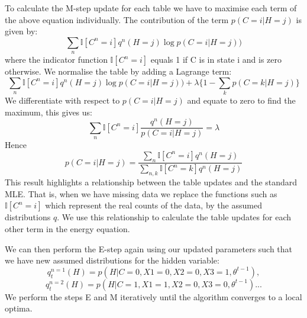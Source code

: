 \documentclass[12pt]{article} %
\begin{document}
To calculate the M-step update for each table we have to maximise each term of the above equation individually. The contribution of the term $p(C=i|H=j)$ is given by:
$$
\displaystyle\sum_{n}\mathbb{I}[C^n=i]q^n(H=j) \log p(C=i|H=j))
$$
where the indicator function $\mathbb{I}[C^n=i]$ equals 1 if C is in state i and is zero otherwise.
We normalise the table by adding a Lagrange term:
$$
\displaystyle\sum_{n}\mathbb{I}[C^n=i]q^n(H=j) \log p(C=i|H=j))
+ \lambda\{1-\sum_{k}p(C=k|H=j)\}
$$
We differentiate with respect to $p(C=i|H=j)$ and equate to zero to find the maximum, this gives us:
$$
\displaystyle\sum_{n}\mathbb{I}[C^n=i] \frac{q^n(H=j)}{p(C=i|H=j)} = \lambda
$$
Hence
$$
p(C=i|H=j)=
\frac{\sum_{n}\mathbb{I}[C^n=i]q^n(H=j)}{\sum_{n,k}\mathbb{I}[C^n=k]q^n(H=j)}
$$
This result highlights a relationship between the table updates and the standard MLE. That is, when we have missing data we replace the functions such as $\mathbb{I}[C^n=i]$ which represent the real counts of the data, by the assumed distributions $q$. We use this relationship to calculate the table updates for each other term in the energy equation.

We can then perform the E-step again using our updated parameters such that we have new assumed distributions for the hidden variable:
$$
q_{t}^{n=1}(H)=p(H|C=0,X1=0,X2=0,X3=1,\theta^{t-1}),
$$
$$
q_{t}^{n=2}(H)=p(H|C=1,X1=1,X2=0,X3=0,\theta^{t-1})...
$$
We perform the steps E and M iteratively until the algorithm converges to a local optima.
\end{document}
